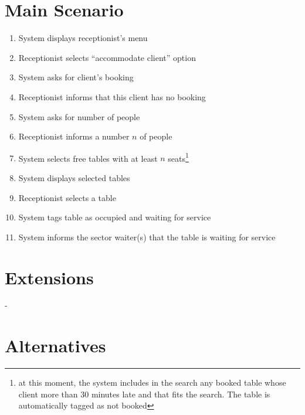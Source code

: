 \documentclass[a4paper,11pt,oneside]{book}
\begin{document}
\section{Main Scenario}

\begin{enumerate}
\item System displays receptionist's menu
\item Receptionist selects ``accommodate client'' option
\item System asks for client's booking
\item \label{accommodate:nobooking}Receptionist informs that this client has no booking
\item \label{accommodate:asknumber}System asks for number of people
\item Receptionist informs a number $n$ of people
\item System selects free tables with at least $n$ seats\footnote{at this moment, the system includes in the search any booked table whose client more than 30 minutes late and that fits the search. The table is automatically tagged as not booked}
\item System displays selected tables
\item Receptionist selects a table
\item \label{accomodate:tag} System tags table as occupied and waiting for service
\item System informs the sector waiter(s) that the table is waiting for service
\end{enumerate}

\section{Extensions}

-

\section{Alternatives}
\end{document}
